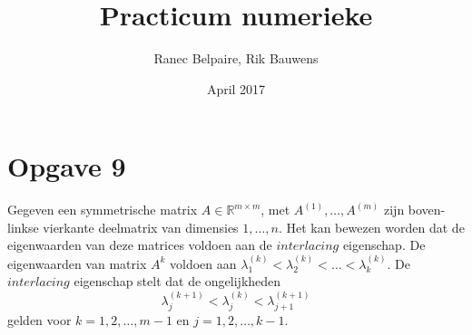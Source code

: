 \documentclass{article}
\title{Practicum numerieke}
\author{Ranec Belpaire, Rik Bauwens }
\date{April 2017}
\begin{document}
\maketitle

\section{Opgave 9}
Gegeven een symmetrische matrix $A \in \mathbb{R}^{m \times m}$, met $A^{(1)}, \dots, A^{(m)}$ zijn boven-linkse vierkante deelmatrix van dimensies $1, \dots, n$. Het kan bewezen worden dat de eigenwaarden van deze matrices voldoen aan de $interlacing$ eigenschap. De eigenwaarden van matrix $A^{k}$ voldoen aan $\lambda^{(k)}_{1} < \lambda^{(k)}_{2} < \dots < \lambda^{(k)}_{k}$.  De $interlacing$ eigenschap stelt dat de ongelijkheden $$\lambda^{(k+1)}_{j} < \lambda^{(k)}_{j} < \lambda^{(k+1)}_{j+1}$$ gelden voor $k=1,2,\dots,m-1$ en $j=1,2,\dots,k-1$.
\end{document}
